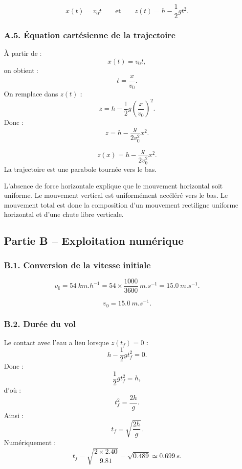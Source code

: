 \documentclass[11pt,a4paper]{article}
\begin{document}
\begin{resultatbox}
\[
\boxed{x(t)=v_0t}
\qquad\text{et}\qquad
\boxed{z(t)=h-\frac12gt^2.}
\]
\end{resultatbox}

\subsubsection*{A.5. Équation cartésienne de la trajectoire}

À partir de :
\[
x(t)=v_0t,
\]
on obtient :
\[
t=\frac{x}{v_0}.
\]
On remplace dans $z(t)$ :
\[
z=h-\frac12g\left(\frac{x}{v_0}\right)^2.
\]
Donc :
\[
z=h-\frac{g}{2v_0^2}x^2.
\]

\begin{resultatbox}
\[
\boxed{z(x)=h-\frac{g}{2v_0^2}x^2.}
\]
La trajectoire est une parabole tournée vers le bas.
\end{resultatbox}

\begin{remarquebox}
L'absence de force horizontale explique que le mouvement horizontal soit uniforme. Le mouvement vertical est uniformément accéléré vers le bas.
Le mouvement total est donc la composition d'un mouvement rectiligne uniforme horizontal et d'une chute libre verticale.
\end{remarquebox}

\subsection{Partie B -- Exploitation numérique}

\subsubsection*{B.1. Conversion de la vitesse initiale}

\[
v_0=\SI{54}{km.h^{-1}}
=54\times \frac{1000}{3600}\ \si{m.s^{-1}}
=15.0\ \si{m.s^{-1}}.
\]

\begin{resultatbox}
\[
\boxed{v_0=\SI{15.0}{m.s^{-1}}.}
\]
\end{resultatbox}

\subsubsection*{B.2. Durée du vol}

Le contact avec l'eau a lieu lorsque $z(t_f)=0$ :
\[
h-\frac12gt_f^2=0.
\]
Donc :
\[
\frac12gt_f^2=h,
\]
d'où :
\[
t_f^2=\frac{2h}{g}.
\]
Ainsi :
\[
t_f=\sqrt{\frac{2h}{g}}.
\]
Numériquement :
\[
t_f=\sqrt{\frac{2\times 2.40}{9.81}}
=\sqrt{0.489}
\simeq 0.699\ \si{s}.
\]
\end{document}
